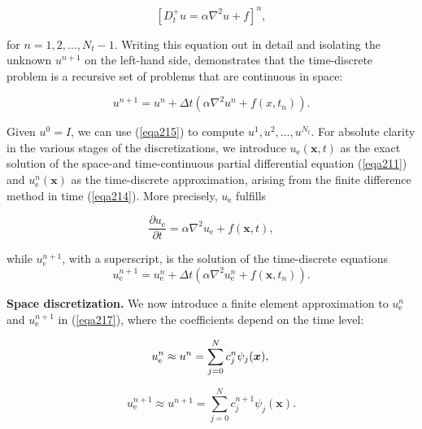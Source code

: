 \documentclass[../main.tex]{subfiles}
\begin{document}
	\begin{equation}
	\label{eqa214}	
		\left[D_{t}^{+} u=\alpha \nabla^{2} u+f\right]^{n},
	\end{equation}

	\noindent for $n=1,2, \ldots, N_{t}-1$. Writing this equation out in detail and isolating the unknown $u^{n+1}$ on the left-hand side, demonstrates that the time-discrete problem is a recursive set of problems that are continuous in space:

	\begin{equation}
	\label{eqa215}	
		u^{n+1}=u^{n}+\Delta t\left(\alpha \nabla^{2} u^{n}+f\left(x, t_{n}\right)\right) .
	\end{equation}

	\noindent Given $u^{0}=I$, we can use (\ref{eqa215}) to compute $u^{1}, u^{2}, \ldots, u^{N_{t}}$.\smallbreak
	For absolute clarity in the various stages of the discretizations, we introduce $u_{\mathrm{e}}(\boldsymbol{x}, t)$ as the exact solution of the space-and time-continuous partial differential equation (\ref{eqa211}) and $u_{\mathrm{e}}^{n}(\boldsymbol{x})$ as the time-discrete approximation, arising from the finite difference method in time (\ref{eqa214}). More precisely, $u_{\mathrm{e}}$ fulfills
		
	\begin{equation}
	\label{eqa216}	
		\frac{\partial u_{\mathrm{e}}}{\partial t}=\alpha \nabla^{2} u_{\mathrm{e}}+f(\boldsymbol{x}, t),
	\end{equation}

	\noindent while $u_{e}^{n+1}$, with a superscript, is the solution of the time-discrete equations
	\begin{equation}
	\label{eqa217}	
		u_{\mathrm{e}}^{n+1}=u_{\mathrm{e}}^{n}+\Delta t\left(\alpha \nabla^{2} u_{\mathrm{e}}^{n}+f\left(\boldsymbol{x}, t_{n}\right)\right) .
	\end{equation}

		\textbf{Space discretization.  } We now introduce a finite element approximation to $u_{\mathrm{e}}^{n}$ and $u_{\mathrm{e}}^{n+1}$ in (\ref{eqa217}), where the coefficients depend on the time level:
		
		\begin{equation}
			\label{eqa218}	
			u_{\mathrm{e}}^{n} \approx u^{n}=\sum_{j=0}^{N} c_{j}^{n} \psi_{j}(\boldsymbol{x}), \\
		\end{equation}
	
		\begin{equation}
			\label{eqa219}	
			u_{\mathrm{e}}^{n+1} \approx u^{n+1}=\sum_{j=0}^{N} c_{j}^{n+1} \psi_{j}(\boldsymbol{x}) .
		\end{equation}
	
\end{document}
